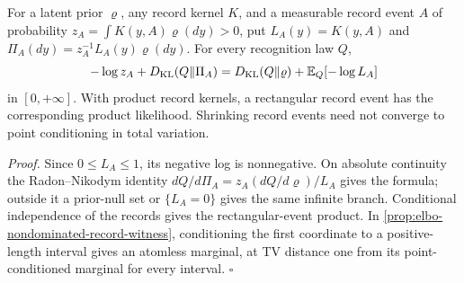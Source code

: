 For a latent prior $\varrho$, any record kernel $K$, and a measurable
record event $A$ of probability $z_A=\int K(y,A)\varrho(dy)>0$, put
$L_A(y)=K(y,A)$ and $\Pi_A(dy)=z_A^{-1}L_A(y)\varrho(dy)$. For every
recognition law $Q$,
\begin{equation}
-\log z_A+D_{\mathrm{KL}}(Q\Vert\Pi_A)
=D_{\mathrm{KL}}(Q\Vert\varrho)+\mathbb E_Q[-\log L_A]
\label{eq:elbo-record-event}
\end{equation}
in $[0,+\infty]$. With product record kernels, a rectangular record event
has the corresponding product likelihood. Shrinking record events need
not converge to point conditioning in total variation.

\noindent\emph{Proof.}
Since $0\leq L_A\leq1$, its negative log is nonnegative. On absolute
continuity the Radon--Nikodym identity
$dQ/d\Pi_A=z_A(dQ/d\varrho)/L_A$ gives the formula; outside it a
prior-null set or $\{L_A=0\}$ gives the same infinite branch.
Conditional independence of the records gives the rectangular-event
product. In \cref{prop:elbo-nondominated-record-witness}, conditioning the
first coordinate to a positive-length interval gives an atomless marginal,
at TV distance one from its point-conditioned marginal for every interval.
\hfill$\square$

